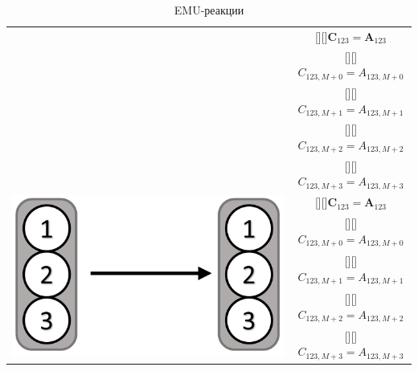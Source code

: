 \documentclass[14pt, a4paper]{extreport}
\newcommand{\adj}[1]{\raisebox{-2pt}[\height][\depth]{#1}}
\begin{document}
\begin{table}[!h]
\begin{center}
\begin{tabular}{c | c}
{\begin{minipage}{0.3\linewidth}
				\end{minipage}
			} 
			& \adj{$\mathbf{C}_{123} = \mathbf{A}_{123}$}\\[.5ex]
			& \adj{$C_{123,M+0} = A_{123,M+0}$}\\ [.5ex]
			& \adj{$C_{123,M+1} = A_{123,M+1}$}\\ [.5ex]
			& \adj{$C_{123,M+2} = A_{123,M+2}$} \\ [.5ex]
			& \adj{$C_{123,M+3} = A_{123,M+3}$} \\ [.5ex]
			\hline 
			\multirow{5}{*}[-1mm]{
				\begin{minipage}{0.3\linewidth}
					\centering{Унимолекулярная реакция}
					\includegraphics[scale=0.85]{EMU_reaction_3.png}
				\end{minipage}
			} 
			& \adj{$\mathbf{C}_{123} = \mathbf{A}_{123}$}\\[.5ex]
			& \adj{$C_{123,M+0} = A_{123,M+0}$}\\ [.5ex]
			& \adj{$C_{123,M+1} = A_{123,M+1}$}\\ [.5ex]
			& \adj{$C_{123,M+2} = A_{123,M+2}$} \\ [.5ex]
			& \adj{$C_{123,M+3} = A_{123,M+3}$} \\ [.5ex]
			\hline 
		\end{tabular}
		\caption{EMU-реакции}
		\label{EMU_reactions}
	\end{center}
\end{table} %
\end{document}
